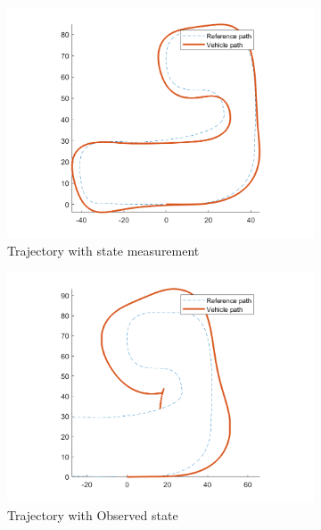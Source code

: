 \begin{figure}[H]
    \centering
     \begin{subfigure}[b]{0.47\textwidth}
         \centering
         \includegraphics[width=\textwidth]{Latex report/image/ex2/trajectory12.png}
         \caption{Trajectory with state measurement}
         \label{fig:traj31}
     \end{subfigure}
     \begin{subfigure}[b]{0.47\textwidth}
         \centering
         \includegraphics[width=\textwidth]{Latex report/image/ex2/trajectory2.png}
         \caption{Trajectory with Observed state}
         \label{fig:traj32}
     \end{subfigure}
     \begin{subfigure}[b]{0.47\textwidth}

\end{subfigure}
\end{figure}
